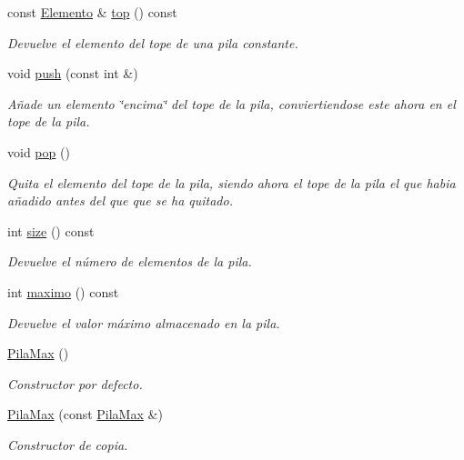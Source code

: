 \begin{DoxyCompactItemize}
const \hyperlink{structElemento}{Elemento} \& \hyperlink{classPilaMax_a78059a1c7a74ccbc9107aec59977b83c}{top} () const
\begin{DoxyCompactList}\small\item\em Devuelve el elemento del tope de una pila constante. \end{DoxyCompactList}\item 
void \hyperlink{classPilaMax_a68d85126d08a5a73bce655390e5bf2d7}{push} (const int \&)
\begin{DoxyCompactList}\small\item\em Añade un elemento \char`\"{}encima\char`\"{} del tope de la pila, conviertiendose este ahora en el tope de la pila. \end{DoxyCompactList}\item 
void \hyperlink{classPilaMax_ac728a5593dbd9acb5d400f416e680736}{pop} ()
\begin{DoxyCompactList}\small\item\em Quita el elemento del tope de la pila, siendo ahora el tope de la pila el que habia añadido antes del que que se ha quitado. \end{DoxyCompactList}\item 
int \hyperlink{classPilaMax_ab920daacfaac5fceda9aa9b1b28b869a}{size} () const
\begin{DoxyCompactList}\small\item\em Devuelve el número de elementos de la pila. \end{DoxyCompactList}\item 
int \hyperlink{classPilaMax_aeed1b737e5130f0d281b90303e1cf9bd}{maximo} () const
\begin{DoxyCompactList}\small\item\em Devuelve el valor máximo almacenado en la pila. \end{DoxyCompactList}\item 
\mbox{\label{classPilaMax_a6e5226f0653735e4b9d3225e7fb334c4}} 
\hyperlink{classPilaMax_a6e5226f0653735e4b9d3225e7fb334c4}{Pila\+Max} ()
\begin{DoxyCompactList}\small\item\em Constructor por defecto. \end{DoxyCompactList}\item 
\hyperlink{classPilaMax_af092e43441ce9df4066c5157f73b8e7a}{Pila\+Max} (const \hyperlink{classPilaMax}{Pila\+Max} \&)
\begin{DoxyCompactList}\small\item\em Constructor de copia. \end{DoxyCompactList}\item 

\end{DoxyCompactItemize}
